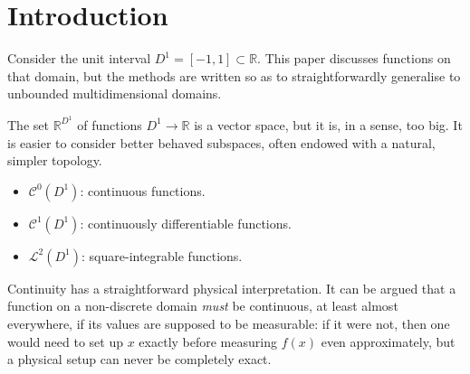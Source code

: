 \documentclass[sigplan,review,anonymous]{acmart}\settopmatter{printfolios=true,printccs=false,printacmref=false}
\begin{document}


\maketitle


\section{Introduction}

Consider the unit interval $D^1 = [-1,1] \subset \mathbb{R}$.
This paper discusses functions on that domain, but the methods are written so as to straightforwardly generalise to unbounded multidimensional domains.

The set $\mathbb{R}^{D^1}$ of functions $D^1 \to \mathbb{R}$ is a vector space, but it is, in a sense, too big.
It is easier to consider better behaved subspaces, often endowed with a natural, simpler topology.
\begin{itemize}
\item $\mathcal{C}^0(D^1)$: continuous functions.
 \item $\mathcal{C}^1(D^1)$: continuously differentiable functions. %
 \item $\mathcal{L}^2(D^1)$: square-integrable functions. %
\end{itemize}
Continuity has a straightforward physical interpretation. It can be argued that a function on a non-discrete domain \emph{must} be continuous, at least almost everywhere,
if its values are supposed to be measurable: if it were not, then one would need to set up $x$ exactly before measuring $f(x)$ even approximately, but a physical setup can never be completely exact.
\end{document}
